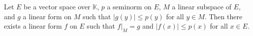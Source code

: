Let $E$ be a vector space over $\mathbb{K}$, $p$ a seminorm on $E$, $M$ a linear subspace of $E$, and $g$ a linear form on $M$ such that $|g(y)| \leq p(y)$ for all $y \in M$. Then there exists a linear form $f$ on $E$ such that $f|_M = g$ and $|f(x)| \leq p(x)$ for all $x \in E$.

